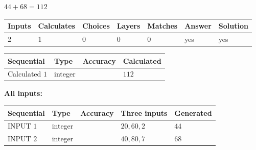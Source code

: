 \documentclass[12pt]{article}
\begin{document}
 
\noindent{}
 
 

 
 
 
\noindent{}
 
 

$ %
44 +  %
68=   %
112$
 
 
\noindent{}
 
 

 
   
   
   
   
\noindent\begin{tabular}{|l|l|l|l|l|l|l|}
 \hline
Inputs & Calculates & Choices & Layers & Matches & Answer & Solution \\ \hline
 2  & 
 1  & 
 0
  & 
 0  & 
 0  & 
  yes & 
  yes 
  \\ \hline
 \end{tabular}
   
   
   
   
\noindent{}
   
   
  
  
\noindent\begin{tabular}{|l|l|l|l|}
\hline
 Sequential & Type & Accuracy & Calculated \\ 
\hline
 
 
  Calculated $  1 $ & integer &  & 
  $ 112 $ 
 \\  \hline  
 \end{tabular}
   
   
   
   
\noindent\vspace{0.1in}\hspace{-0.08in} {\textbf{\Large{All inputs: }}}
   
   
  
  
\noindent\begin{tabular}{|l|l|l|l|l|}
\hline
 Sequential & Type & Accuracy & Three inputs & Generated \\ 
\hline
 
 
  INPUT $  1 $ & integer &  & $
 20
 , 
 60
 , 
 2
 $ & $ 44 $ 
 \\  \hline  
 
 
  INPUT $  2 $ & integer &  & $
 40
 , 
 80
 , 
 7
 $ & $ 68 $ 
 \\  \hline  
 \end{tabular}
   
\end{document}
